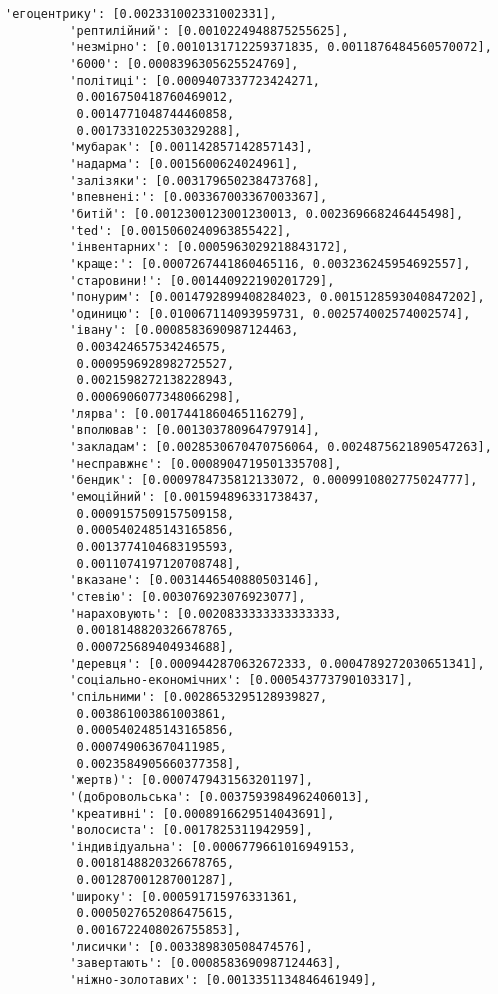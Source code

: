 \documentclass[11pt]{article}
\begin{document}
\begin{Verbatim}[commandchars=\\\{\}]
         'егоцентрику': [0.002331002331002331],
         'рептилійний': [0.0010224948875255625],
         'незмірно': [0.0010131712259371835, 0.0011876484560570072],
         '6000': [0.0008396305625524769],
         'політиці': [0.0009407337723424271,
          0.0016750418760469012,
          0.0014771048744460858,
          0.0017331022530329288],
         'мубарак': [0.001142857142857143],
         'надарма': [0.0015600624024961],
         'залізяки': [0.003179650238473768],
         'впевнені:': [0.003367003367003367],
         'битій': [0.0012300123001230013, 0.002369668246445498],
         'ted': [0.0015060240963855422],
         'інвентарних': [0.0005963029218843172],
         'краще:': [0.0007267441860465116, 0.003236245954692557],
         'старовини!': [0.001440922190201729],
         'понурим': [0.0014792899408284023, 0.0015128593040847202],
         'одиницю': [0.010067114093959731, 0.002574002574002574],
         'івану': [0.0008583690987124463,
          0.003424657534246575,
          0.0009596928982725527,
          0.0021598272138228943,
          0.0006906077348066298],
         'лярва': [0.0017441860465116279],
         'вполював': [0.001303780964797914],
         'закладам': [0.0028530670470756064, 0.0024875621890547263],
         'несправжнє': [0.0008904719501335708],
         'бендик': [0.0009784735812133072, 0.0009910802775024777],
         'емоційний': [0.001594896331738437,
          0.0009157509157509158,
          0.0005402485143165856,
          0.0013774104683195593,
          0.0011074197120708748],
         'вказане': [0.0031446540880503146],
         'стевію': [0.003076923076923077],
         'нараховують': [0.0020833333333333333,
          0.0018148820326678765,
          0.000725689404934688],
         'деревця': [0.0009442870632672333, 0.0004789272030651341],
         'соціально-економічних': [0.000543773790103317],
         'спільними': [0.0028653295128939827,
          0.003861003861003861,
          0.0005402485143165856,
          0.000749063670411985,
          0.0023584905660377358],
         'жертв)': [0.0007479431563201197],
         '(добровольська': [0.0037593984962406013],
         'креативні': [0.0008916629514043691],
         'волосиста': [0.0017825311942959],
         'індивідуальна': [0.0006779661016949153,
          0.0018148820326678765,
          0.001287001287001287],
         'широку': [0.000591715976331361,
          0.0005027652086475615,
          0.0016722408026755853],
         'лисички': [0.003389830508474576],
         'завертають': [0.0008583690987124463],
         'ніжно-золотавих': [0.0013351134846461949],

\end{Verbatim}
\end{document}
